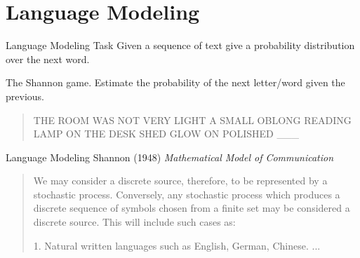 \documentclass{beamer}
\begin{document}
\section{Language Modeling}

\begin{frame}{Language Modeling Task}
  Given a sequence of text give a probability distribution 
  over the next word. 

\air

  The Shannon game. Estimate the probability of the next letter/word
  given the previous.

  \begin{quote}
    THE ROOM WAS NOT VERY LIGHT A SMALL OBLONG READING LAMP ON THE
    DESK SHED GLOW ON POLISHED \_\_\_\
  \end{quote}


\end{frame}


\begin{frame}{Language Modeling}
  Shannon (1948) \textit{Mathematical Model of Communication} 

\air
  
\begin{quote}  
  We may consider a discrete source, therefore,
to be represented by a stochastic process. Conversely, any stochastic
process which produces a discrete sequence of symbols chosen from a finite
set may be considered a discrete source. This will include such cases as:

1. Natural written languages such as English, German, Chinese.
...
\end{quote}
\end{frame}
\end{document}
